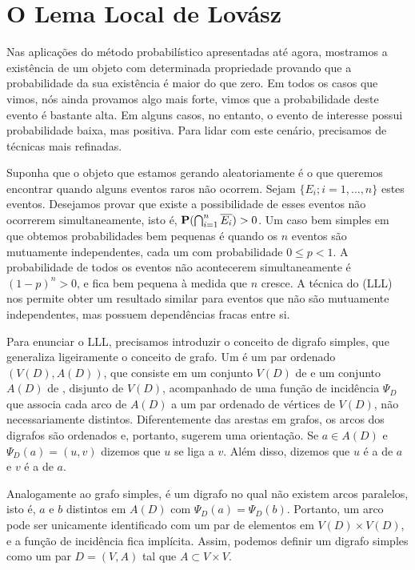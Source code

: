 
\section{O Lema Local de Lovász}


Nas aplicações do método probabilístico apresentadas até agora, mostramos a existência de um objeto com determinada propriedade provando que a probabilidade da sua existência é maior do que zero. Em todos os casos que vimos, nós ainda provamos algo mais forte, vimos que a probabilidade deste evento é bastante alta. Em alguns casos, no entanto, o evento de interesse possui probabilidade baixa, mas positiva. Para lidar com este cenário, precisamos de técnicas mais refinadas.

Suponha que o objeto que estamos gerando aleatoriamente é o que queremos encontrar quando alguns eventos raros não ocorrem. Sejam $\{E_i; i = 1,\dots,n\}$ estes eventos. Desejamos provar que existe a possibilidade de esses eventos não ocorrerem simultaneamente, isto é,  $\operatorname{\mathbf{P}}(\bigcap_{i=1}^n \overline{E_i}) > 0$. Um caso bem simples em que obtemos probabilidades bem pequenas é quando os $n$ eventos são mutuamente independentes, cada um com probabilidade $0 \leq p<1$. A probabilidade de todos os eventos não acontecerem simultaneamente é $(1-p)^n > 0$, e fica bem pequena à medida que $n$ cresce. A técnica do  (LLL) nos permite obter um resultado similar para eventos que não são mutuamente independentes, mas possuem dependências fracas entre si.

Para enunciar o LLL, precisamos introduzir o conceito de digrafo simples, que generaliza ligeiramente o conceito de grafo. Um  é um par ordenado $(V(D), A(D))$, que consiste em um conjunto $V(D)$ de  e um conjunto $A(D)$ de , disjunto de $V(D)$, acompanhado de uma função de incidência $\Psi_D$ que associa cada arco de $A(D)$ a um par ordenado de vértices de $V(D)$, não necessariamente distintos. Diferentemente das arestas em grafos, os arcos dos digrafos são ordenados e, portanto, sugerem uma orientação. Se $a \in A(D)$ e $\Psi_D(a) = (u,v)$ dizemos que $u$ se liga a $v$. Além disso, dizemos que $u$ é a  de $a$ e $v$ é a  de $a$.

Analogamente ao grafo simples,  é um digrafo no qual não existem arcos paralelos, isto é, $a$ e $b$ distintos em $A(D)$ com $\Psi_D(a) = \Psi_D(b)$. Portanto, um arco pode ser unicamente identificado com um par de elementos em $V(D) \times V(D)$, e a função de incidência fica implícita. Assim, podemos definir um digrafo simples como um par $D = (V,A)$ tal que $A \subset V\times V$.

